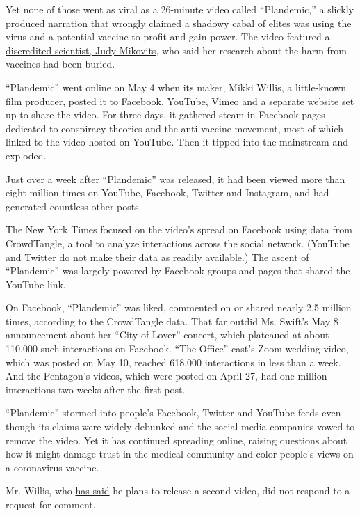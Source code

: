 Yet none of those went as viral as a 26-minute video called
``Plandemic,'' a slickly produced narration that wrongly claimed a
shadowy cabal of elites was using the virus and a potential vaccine to
profit and gain power. The video featured a
\href{https://www.nytimes3xbfgragh.onion/2020/05/09/technology/plandemic-judy-mikovitz-coronavirus-disinformation.html}{discredited
scientist, Judy Mikovits}, who said her research about the harm from
vaccines had been buried.

``Plandemic'' went online on May 4 when its maker, Mikki Willis, a
little-known film producer, posted it to Facebook, YouTube, Vimeo and a
separate website set up to share the video. For three days, it gathered
steam in Facebook pages dedicated to conspiracy theories and the
anti-vaccine movement, most of which linked to the video hosted on
YouTube. Then it tipped into the mainstream and exploded.

Just over a week after ``Plandemic'' was released, it had been viewed
more than eight million times on YouTube, Facebook, Twitter and
Instagram, and had generated countless other posts.

The New York Times focused on the video's spread on Facebook using data
from CrowdTangle, a tool to analyze interactions across the social
network. (YouTube and Twitter do not make their data as readily
available.) The ascent of ``Plandemic'' was largely powered by Facebook
groups and pages that shared the YouTube link.

On Facebook, ``Plandemic'' was liked, commented on or shared nearly 2.5
million times, according to the CrowdTangle data. That far outdid Ms.
Swift's May 8 announcement about her ``City of Lover'' concert, which
plateaued at about 110,000 such interactions on Facebook. ``The Office''
cast's Zoom wedding video, which was posted on May 10, reached 618,000
interactions in less than a week. And the Pentagon's videos, which were
posted on April 27, had one million interactions two weeks after the
first post.

``Plandemic'' stormed into people's Facebook, Twitter and YouTube feeds
even though its claims were widely debunked and the social media
companies vowed to remove the video. Yet it has continued spreading
online, raising questions about how it might damage trust in the medical
community and color people's views on a coronavirus vaccine.

Mr. Willis, who
\href{https://www.latimes.com/entertainment-arts/movies/story/2020-05-13/plandemic-coronavirus-documentary-director-mikki-willis-mikovits}{has
said} he plans to release a second video, did not respond to a request
for comment.


